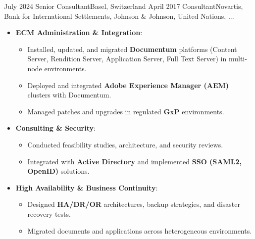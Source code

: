 
\begin{experiences}

\consultantexperience
    {July 2024} {Senior Consultant}{}{Basel, Switzerland}
    {April 2017}    {Consultant}{Novartis, Bank for International Settlements, Johnson \& Johnson, United Nations, ...} {
        \begin{itemize}[left=0pt,label={},itemsep=0.5em]

          \item \textbf{ECM Administration \& Integration}:
            \begin{itemize}[itemsep=0.2em,topsep=0.2em,parsep=0pt]
              \small
              \item Installed, updated, and migrated \textbf{Documentum} platforms (Content Server, Rendition Server, Application Server, Full Text Server) in multi-node environments.
              \item Deployed and integrated \textbf{Adobe Experience Manager (AEM)} clusters with Documentum.
              \item Managed patches and upgrades in regulated \textbf{GxP} environments.
            \end{itemize}

          \item \textbf{Consulting \& Security}:
            \begin{itemize}[itemsep=0.2em,topsep=0.2em,parsep=0pt]
              \small
              \item Conducted feasibility studies, architecture, and security reviews.
              \item Integrated with \textbf{Active Directory} and implemented \textbf{SSO (SAML2, OpenID)} solutions.
            \end{itemize}

          \item \textbf{High Availability \& Business Continuity}:
            \begin{itemize}[itemsep=0.2em,topsep=0.2em,parsep=0pt]
              \small
              \item Designed \textbf{HA/DR/OR} architectures, backup strategies, and disaster recovery tests.
              \item Migrated documents and applications across heterogeneous environments.
            \end{itemize}


\end{itemize}}
\end{experiences}
